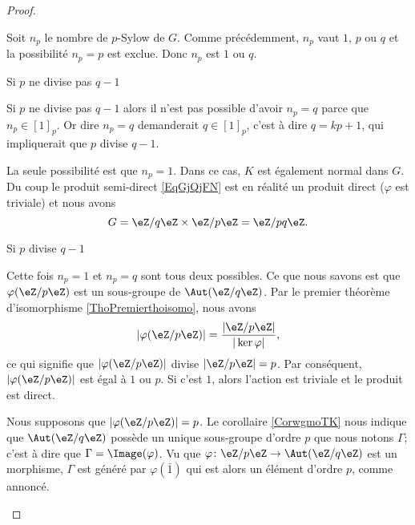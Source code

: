 \begin{proof}
\begin{subproof}
        Soit \( n_p\) le nombre de \( p\)-Sylow de \( G\). Comme précédemment, \( n_p\) vaut \( 1\), \( p\) ou \( q\) et la possibilité \( n_p=p\) est exclue. Donc \( n_p\) est \( 1\) ou \( q\).

    \item[Si \( p\) ne divise pas \( q-1\)]

        Si \( p\) ne divise pas \( q-1\) alors il n'est pas possible d'avoir \( n_p=q\) parce que \( n_p\in [1]_p\). Or dire \( n_p=q\) demanderait \( q\in [1]_p\), c'est à dire \( q=kp+1\), qui impliquerait que \( p\) divise \( q-1\).

        La seule possibilité est que \( n_p=1\). Dans ce cas, \( K\) est également normal dans \( G\). Du coup le produit semi-direct \eqref{EqGjQjFN} est en réalité un produit direct (\( \varphi\) est triviale) et nous avons
        \begin{equation}
            G=\eZ/q\eZ\times \eZ/p\eZ=\eZ/pq\eZ.
        \end{equation}

    \item[Si \( p\) divise \( q-1\)]
    
        Cette fois \( n_p=1\) et \( n_p=q\) sont tous deux possibles. Ce que nous savons est que \( \varphi(\eZ/p\eZ)\) est un sous-groupe de \( \Aut(\eZ/q\eZ)\). Par le premier théorème d'isomorphisme \ref{ThoPremierthoisomo}, nous avons
        \begin{equation}
            | \varphi(\eZ/p\eZ) |=\frac{ | \eZ/p\eZ | }{ | \ker\varphi | },
        \end{equation}
        ce qui signifie que \( | \varphi(\eZ/p\eZ) |\) divise \( | \eZ/p\eZ |=p\). Par conséquent, \( | \varphi(\eZ/p\eZ) |\) est égal à \( 1\) ou \( p\). Si c'est \( 1\), alors l'action est triviale et le produit est direct.

        Nous supposons que \( | \varphi(\eZ/p\eZ) |=p\). Le corollaire \ref{CorwgmoTK} nous indique que \( \Aut(\eZ/q\eZ)\) possède un unique sous-groupe d'ordre \( p\) que nous notons \( \Gamma\); c'est à dire que \( \Gamma=\Image(\varphi)\). Vu que \( \varphi\colon \eZ/p\eZ\to \Aut(\eZ/q\eZ)\) est un morphisme, \( \Gamma\) est généré par \( \varphi(\bar 1)\) qui est alors un élément d'ordre \( p\), comme annoncé.


\end{subproof}
\end{proof}
